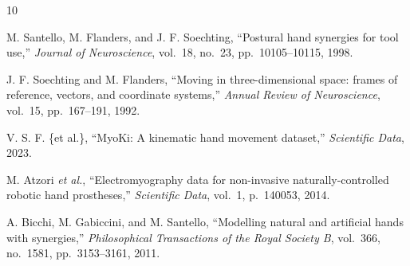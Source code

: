 \documentclass[12pt,a4paper]{report}
\begin{document}

\begin{thebibliography}{10}

M. Santello, M. Flanders, and J. F. Soechting,
``Postural hand synergies for tool use,''
\textit{Journal of Neuroscience}, vol.~18, no.~23, pp.~10105--10115, 1998.

J. F. Soechting and M. Flanders,
``Moving in three-dimensional space: frames of reference, vectors, and coordinate systems,''
\textit{Annual Review of Neuroscience}, vol.~15, pp.~167--191, 1992.

V. S. F. \{et al.\},
``MyoKi: A kinematic hand movement dataset,''
\textit{Scientific Data}, 2023.

M. Atzori \textit{et al.},
``Electromyography data for non-invasive naturally-controlled robotic hand prostheses,''
\textit{Scientific Data}, vol.~1, p.~140053, 2014.

A. Bicchi, M. Gabiccini, and M. Santello,
``Modelling natural and artificial hands with synergies,''
\textit{Philosophical Transactions of the Royal Society B}, vol.~366, no.~1581, pp.~3153--3161, 2011.

\end{thebibliography}
\end{document}
